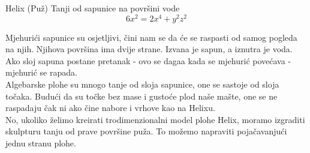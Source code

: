 \begin{surferPage}{Helix (Pu\v{z})}
Tanji od sapunice na povr\v{s}ini vode \\
  \smallskip
\[6x^2	= 2x^4	+ y^2	z^2\]

\singlespacing
Mjehuri\'{c}i sapunice su osjetljivi, \v{c}ini nam se da \'{c}e se raspasti od samog pogleda na njih. Njihova povr\v{s}ina ima dvije strane. Izvana je sapun, a iznutra je voda. Ako sloj sapuna postane pretanak - ovo se daga\dj{}a kada se mjehuri\'{c} pove\'{c}ava - mjehuri\'{c} se rapada.\\
\vspace{0,3cm}
Algebarske plohe su mnogo tanje od sloja sapunice, one se sastoje od sloja to\v{c}aka. Budu\'{c}i da su to\v{c}ke bez mase i gusto\'{c}e plod na\v{s}e ma\v{s}te, one se ne raspadaju \v{c}ak ni ako \v{c}ine nabore i vrhove kao na Helixu.\\
\vspace{0,3cm}
No, ukoliko \v{z}elimo kreirati trodimenzionalni model plohe Helix, moramo izgraditi skulpturu tanju od prave povr\v{s}ine pu\v{z}a. To mo\v{z}emo napraviti poja\v{c}avanju\'{c}i jednu stranu plohe.
\end{surferPage}
